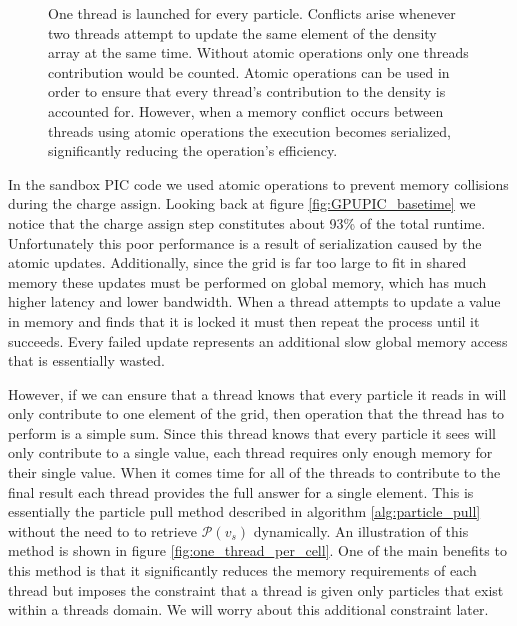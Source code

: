 \begin{figure}
\begin{center}

\end{center}
\caption[Density Accumulation Memory Collisions]{One thread is launched for every particle. Conflicts arise whenever two threads attempt to update the same element of the density array at the same time. Without atomic operations only one threads contribution would be counted.  Atomic operations can be used in order to ensure that every thread's contribution to the density is accounted for. However, when a memory conflict occurs between threads using atomic operations the execution becomes serialized, significantly reducing the operation's efficiency.}
\label{fig:atomic_memory_collisions}
\end{figure}

In the sandbox PIC code we used atomic operations to prevent memory collisions during the charge assign. Looking back at figure \ref{fig:GPUPIC_basetime} we notice that the charge assign step constitutes about 93\% of the total runtime.  Unfortunately this poor performance is a result of serialization caused by the atomic updates. Additionally, since the grid is far too large to fit in shared memory these updates must be performed on global memory, which has much higher latency and lower bandwidth. When a thread attempts to update a value in memory and finds that it is locked it must then repeat the process until it succeeds. Every failed update represents an additional slow global memory access that is essentially wasted.




However, if we can ensure that a thread knows that every particle it reads in will only contribute to one element of the grid, then operation that the thread has to perform is a simple sum.
Since this thread knows that every particle it sees will only contribute to a single value, each thread requires only enough memory for their single value. 
When it comes time for all of the threads to contribute to the final result each thread provides the full answer for a single element. 
This is essentially the particle pull method described in algorithm \ref{alg:particle_pull} without the need to to retrieve $\mathcal{P}(v_s)$ dynamically. An illustration of this method is shown in figure \ref{fig:one_thread_per_cell}.
One of the main benefits to this method is that it significantly reduces the memory requirements of each thread but imposes the constraint that a thread is given only particles that exist within a threads domain. We will worry about this additional constraint later. 

